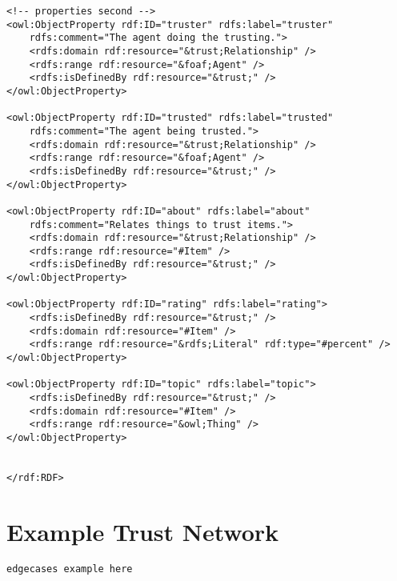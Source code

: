 \documentclass[onecolumn]{acm_proc_article-sp}
\begin{document}
\begin{verbatim}
<!-- properties second -->
<owl:ObjectProperty rdf:ID="truster" rdfs:label="truster"
    rdfs:comment="The agent doing the trusting.">
    <rdfs:domain rdf:resource="&trust;Relationship" />
    <rdfs:range rdf:resource="&foaf;Agent" />
    <rdfs:isDefinedBy rdf:resource="&trust;" />
</owl:ObjectProperty>

<owl:ObjectProperty rdf:ID="trusted" rdfs:label="trusted"
    rdfs:comment="The agent being trusted.">
    <rdfs:domain rdf:resource="&trust;Relationship" />
    <rdfs:range rdf:resource="&foaf;Agent" />
    <rdfs:isDefinedBy rdf:resource="&trust;" />
</owl:ObjectProperty>

<owl:ObjectProperty rdf:ID="about" rdfs:label="about" 
    rdfs:comment="Relates things to trust items.">
    <rdfs:domain rdf:resource="&trust;Relationship" />
    <rdfs:range rdf:resource="#Item" />
    <rdfs:isDefinedBy rdf:resource="&trust;" />
</owl:ObjectProperty>

<owl:ObjectProperty rdf:ID="rating" rdfs:label="rating">
    <rdfs:isDefinedBy rdf:resource="&trust;" />
    <rdfs:domain rdf:resource="#Item" />
    <rdfs:range rdf:resource="&rdfs;Literal" rdf:type="#percent" />
</owl:ObjectProperty>

<owl:ObjectProperty rdf:ID="topic" rdfs:label="topic">
    <rdfs:isDefinedBy rdf:resource="&trust;" />
    <rdfs:domain rdf:resource="#Item" />
    <rdfs:range rdf:resource="&owl;Thing" />
</owl:ObjectProperty>


</rdf:RDF>
\end{verbatim}


\section{Example Trust Network}
\label{trustExample}

\begin{verbatim}
edgecases example here
\end{verbatim}

\twocolumn

\balancecolumns
\end{document}

